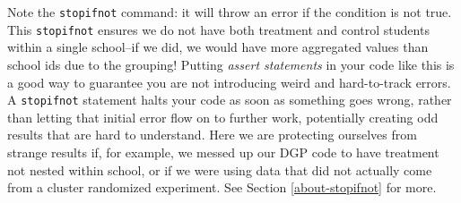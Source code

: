 \documentclass[
]{book}
\newenvironment{Shaded}{\begin{snugshade}}{\end{snugshade}}
\newcommand{\AttributeTok}[1]{\textcolor[rgb]{0.13,0.29,0.53}{#1}}
\newcommand{\ControlFlowTok}[1]{\textcolor[rgb]{0.13,0.29,0.53}{\textbf{#1}}}
\newcommand{\DecValTok}[1]{\textcolor[rgb]{0.00,0.00,0.81}{#1}}
\newcommand{\FunctionTok}[1]{\textcolor[rgb]{0.13,0.29,0.53}{\textbf{#1}}}
\newcommand{\NormalTok}[1]{#1}
\newcommand{\OtherTok}[1]{\textcolor[rgb]{0.56,0.35,0.01}{#1}}
\newcommand{\SpecialCharTok}[1]{\textcolor[rgb]{0.81,0.36,0.00}{\textbf{#1}}}
\newcommand{\StringTok}[1]{\textcolor[rgb]{0.31,0.60,0.02}{#1}}
\begin{document}
\begin{Shaded}
\end{Shaded}

Note the \texttt{stopifnot} command: it will throw an error if the condition is not true.
This \texttt{stopifnot} ensures we do not have both treatment and control students within a single school--if we did, we would have more aggregated values than school ids due to the grouping!
Putting \emph{assert statements} in your code like this is a good way to guarantee you are not introducing weird and hard-to-track errors.
A \texttt{stopifnot} statement halts your code as soon as something goes wrong, rather than letting that initial error flow on to further work, potentially creating odd results that are hard to understand.
Here we are protecting ourselves from strange results if, for example, we messed up our DGP code to have treatment not nested within school, or if we were using data that did not actually come from a cluster randomized experiment.
See Section \ref{about-stopifnot} for more.
\end{document}
